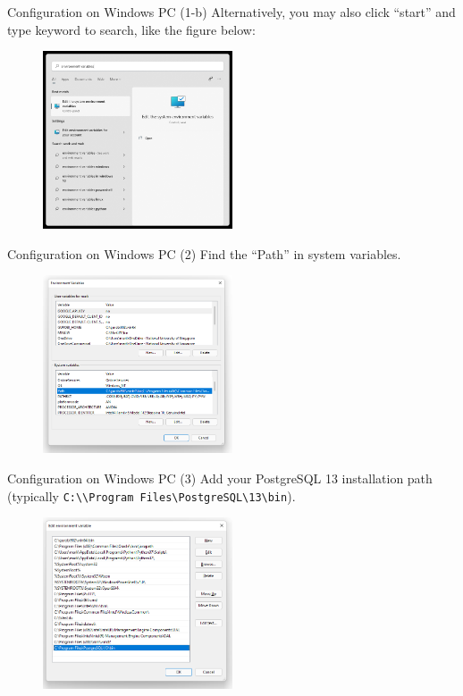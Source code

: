 \begin{frame}[fragile]{Configuration on Windows PC}
	(1-b) Alternatively, you may also click ``start'' and type keyword to search, like the figure below:
	\begin{figure}
		\includegraphics[width=0.5\textwidth]{t0-psql/images/start-search.png}
	\end{figure}
\end{frame}

\begin{frame}[fragile]{Configuration on Windows PC}
	(2) Find the ``Path'' in system variables.
	\begin{figure}
		\includegraphics[width=0.5\textwidth]{t0-psql/images/environment-list.png}
	\end{figure}
\end{frame}

\begin{frame}[fragile]{Configuration on Windows PC}
	(3) Add your PostgreSQL 13 installation path \\(typically \texttt{C:\textbackslash\textbackslash Program Files\textbackslash PostgreSQL\textbackslash 13\textbackslash bin}).
	\begin{figure}
		\includegraphics[width=0.5\textwidth]{t0-psql/images/path-values.png}
	\end{figure}
\end{frame}

